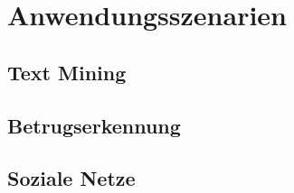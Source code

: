 \chapter{Anwendungsszenarien}
\section{Text Mining}
\section{Betrugserkennung}
\section{Soziale Netze}
